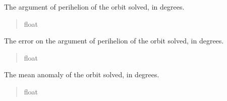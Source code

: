 \documentclass[letterpaper,11pt,english]{sphinxmanual}
\begin{document}
\begin{savenotes}
\begin{fulllineitems}
\begin{savenotes}\begin{fulllineitems}
\label{\detokenize{code/opihiexarata.orbit.solution:opihiexarata.orbit.solution.OrbitalSolution.argument_perihelion}}
\pysigstartsignatures
{}
\pysigstopsignatures
\sphinxAtStartPar
The argument of perihelion of the orbit solved, in degrees.
\begin{quote}\begin{description}
\sphinxAtStartPar
float

\end{description}\end{quote}

\end{fulllineitems}\end{savenotes}


\begin{savenotes}\begin{fulllineitems}
\label{\detokenize{code/opihiexarata.orbit.solution:opihiexarata.orbit.solution.OrbitalSolution.argument_perihelion_error}}
\pysigstartsignatures
{}
\pysigstopsignatures
\sphinxAtStartPar
The error on the argument of perihelion of the orbit solved, in degrees.
\begin{quote}\begin{description}
\sphinxAtStartPar
float

\end{description}\end{quote}

\end{fulllineitems}\end{savenotes}


\begin{savenotes}\begin{fulllineitems}
\label{\detokenize{code/opihiexarata.orbit.solution:opihiexarata.orbit.solution.OrbitalSolution.mean_anomaly}}
\pysigstartsignatures
{}
\pysigstopsignatures
\sphinxAtStartPar
The mean anomaly of the orbit solved, in degrees.
\begin{quote}\begin{description}
\sphinxAtStartPar
float


\end{description}
\end{quote}
\end{fulllineitems}
\end{savenotes}
\end{fulllineitems}
\end{savenotes}
\end{document}
